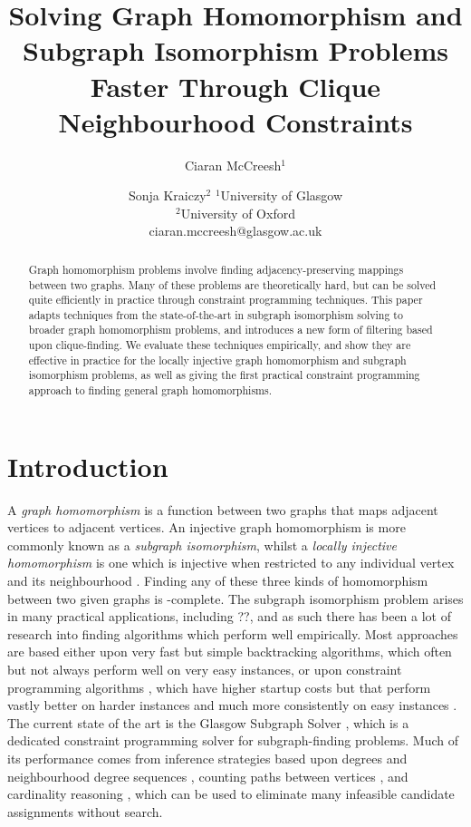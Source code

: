 \documentclass{article}
\title{Solving Graph Homomorphism and Subgraph Isomorphism Problems Faster Through Clique Neighbourhood Constraints}
\author{
Ciaran McCreesh$^1$
\and
Sonja Kraiczy$^2$
\affiliations
$^1$University of Glasgow\\
$^2$University of Oxford\\
\emails
ciaran.mccreesh@glasgow.ac.uk
}
\begin{document}
\maketitle

\begin{abstract}
    Graph homomorphism problems involve finding adjacency-preserving mappings between two graphs.
    Many of these problems are theoretically hard, but can be solved quite efficiently in practice
    through constraint programming techniques.  This paper adapts techniques from the
    state-of-the-art in subgraph isomorphism solving to broader graph homomorphism problems, and
    introduces a new form of filtering based upon clique-finding. We evaluate these techniques
    empirically, and show they are effective in practice for the locally injective graph
    homomorphism and subgraph isomorphism problems, as well as giving the first practical constraint
    programming approach to finding general graph homomorphisms.
\end{abstract}

\section{Introduction}

A \emph{graph homomorphism} is a function between two graphs that maps adjacent vertices to adjacent
vertices. An injective graph homomorphism is more commonly known as a \emph{subgraph isomorphism},
whilst a \emph{locally injective homomorphism} is one which is injective when restricted to any
individual vertex and its neighbourhood \cite{DBLP:journals/csr/FialaK08}. Finding any of these three kinds of homomorphism between
two given graphs is \NP-complete.  The subgraph isomorphism problem arises in many practical
applications, including ??, and as such there has been a lot of research into finding algorithms
which perform well empirically. Most approaches are based either upon very fast but simple
backtracking algorithms,
\cite{DBLP:journals/pami/CordellaFSV04,DBLP:journals/bmcbi/BonniciGPSF13,DBLP:conf/gbrpr/CarlettiFSV17}
which often but not always perform well on very easy instances, or upon constraint programming
algorithms
\cite{DBLP:journals/constraints/ZampelliDS10,DBLP:journals/ai/Solnon10,DBLP:conf/cp/AudemardLMGP14,DBLP:conf/cp/McCreeshP15,DBLP:conf/cpaior/ArchibaldDHMP019},
which have higher startup costs but that perform vastly better on harder instances and much more
consistently on easy instances \cite{DBLP:journals/jair/McCreeshPST18,DBLP:conf/gbrpr/Solnon19}. The
current state of the art is the Glasgow Subgraph Solver \cite{DBLP:conf/gg/McCreeshP020}, which is a
dedicated constraint programming solver for subgraph-finding problems. Much of its performance comes
from inference strategies based upon degrees and neighbourhood degree sequences
\cite{DBLP:journals/constraints/ZampelliDS10}, counting paths between vertices
\cite{DBLP:conf/cp/AudemardLMGP14,DBLP:conf/cp/McCreeshP15}, and cardinality reasoning
\cite{DBLP:journals/ai/Solnon10}, which can be used to eliminate many infeasible candidate
assignments without search.
\end{document}
